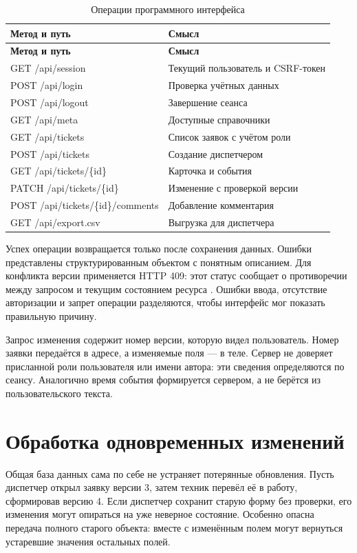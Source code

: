 \documentclass{timcw}
\begin{document}
\begingroup\small\singlespacing
\begin{longtable}{>{\raggedright\arraybackslash}p{}>{\raggedright\arraybackslash}p{}}
\caption{Операции программного интерфейса}\\
\hline
\textbf{Метод и путь} & \textbf{Смысл} \\ \hline
\endfirsthead
\textbf{Метод и путь} & \textbf{Смысл} \\ \hline
\endhead
GET /api/session & Текущий пользователь и CSRF-токен \\ \hline
POST /api/login & Проверка учётных данных \\ \hline
POST /api/logout & Завершение сеанса \\ \hline
GET /api/meta & Доступные справочники \\ \hline
GET /api/tickets & Список заявок с учётом роли \\ \hline
POST /api/tickets & Создание диспетчером \\ \hline
GET /api/tickets/\{id\} & Карточка и события \\ \hline
PATCH /api/tickets/\{id\} & Изменение с проверкой версии \\ \hline
POST /api/tickets/\{id\}/comments & Добавление комментария \\ \hline
GET /api/export.csv & Выгрузка для диспетчера \\ \hline
\end{longtable}
\endgroup

Успех операции возвращается только после сохранения данных. Ошибки представлены структурированным объектом с понятным описанием. Для конфликта версии применяется HTTP 409: этот статус сообщает о противоречии между запросом и текущим состоянием ресурса \cite{src8}. Ошибки ввода, отсутствие авторизации и запрет операции разделяются, чтобы интерфейс мог показать правильную причину.

Запрос изменения содержит номер версии, которую видел пользователь. Номер заявки передаётся в адресе, а изменяемые поля — в теле. Сервер не доверяет присланной роли пользователя или имени автора: эти сведения определяются по сеансу. Аналогично время события формируется сервером, а не берётся из пользовательского текста.

\section{Обработка одновременных изменений}

Общая база данных сама по себе не устраняет потерянные обновления. Пусть диспетчер открыл заявку версии 3, затем техник перевёл её в работу, сформировав версию 4. Если диспетчер сохранит старую форму без проверки, его изменения могут опираться на уже неверное состояние. Особенно опасна передача полного старого объекта: вместе с изменённым полем могут вернуться устаревшие значения остальных полей.
\end{document}
